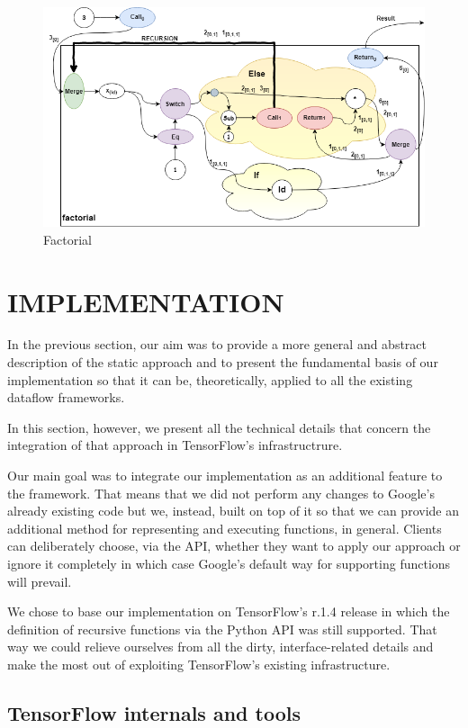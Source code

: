 \documentclass[ack,preface]{dithesis}
\begin{document}
\begin{figure}[h]
\centering
\includegraphics[scale=0.63]{figures/factorial}
\caption{Factorial}
\end{figure}
\chapter{IMPLEMENTATION}
In the previous section, our aim was to provide a more general and abstract description of the static approach and to present the fundamental basis of our implementation so that it can be, theoretically, applied to all the existing dataflow frameworks. 

In this section, however, we present all the technical details that concern the integration of that approach in TensorFlow's infrastructrure.

Our main goal was to integrate our implementation as an additional feature to the framework. That means that we did not perform any changes to Google's already existing code but we, instead, built on top of it so that we can provide an additional method for representing and executing functions, in general. Clients can deliberately choose, via the API, whether they want to apply our approach or ignore it completely in which case Google's default way for supporting functions will prevail.

We chose to base our implementation on TensorFlow's r.1.4 release in which the definition of recursive functions via the Python API was still supported. That way we could relieve ourselves from all the dirty, interface-related details and make the most out of exploiting TensorFlow's existing infrastructure.  

    \section{TensorFlow internals and tools}
\end{document}
